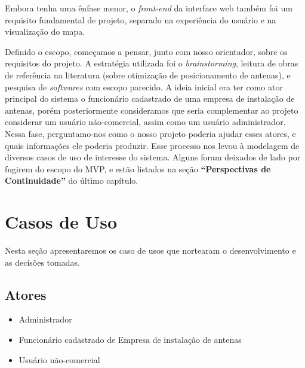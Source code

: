 \documentclass[]{politex}
\begin{document}
Embora tenha uma ênfase menor, o \textit{front-end} da interface web também foi
um requisito fundamental de projeto, separado na experiência do usuário e na
visualização do mapa.

Definido o escopo, começamos a pensar, junto com nosso orientador, sobre os
requisitos do projeto. A estratégia utilizada foi o \textit{brainstorming},
leitura de obras de referência na literatura (sobre otimização de posicionamento
de antenas), e pesquisa de \textit{softwares} com escopo parecido. A ideia
inicial era ter como ator principal do sistema o funcionário cadastrado de uma
empresa de instalação de antenas, porém posteriormente consideramos que seria
complementar ao projeto considerar um usuário não-comercial, assim como um
usuário administrador. Nessa fase, perguntamo-nos como o nosso projeto poderia
ajudar esses atores, e quais informações ele poderia produzir. Esse processo nos
levou à modelagem de diversos casos de uso de interesse do sistema. Alguns foram
deixados de lado por fugirem do escopo do MVP, e estão listados na seção
\textbf{``Perspectivas de Continuidade''} do último capítulo.

\section{Casos de Uso}

Nesta seção apresentaremos os caso de usos que nortearam o desenvolvimento e as
decisões tomadas.

\newcommand{\usecase}[1]{\refstepcounter{usecasecounter}\label{usecase:#1}\arabic{usecasecounter}}

\subsection{Atores}
\begin{itemize}
\item Administrador
\item Funcionário cadastrado de Empresa de instalação de antenas
\item Usuário não-comercial
\end{itemize}
\end{document}
